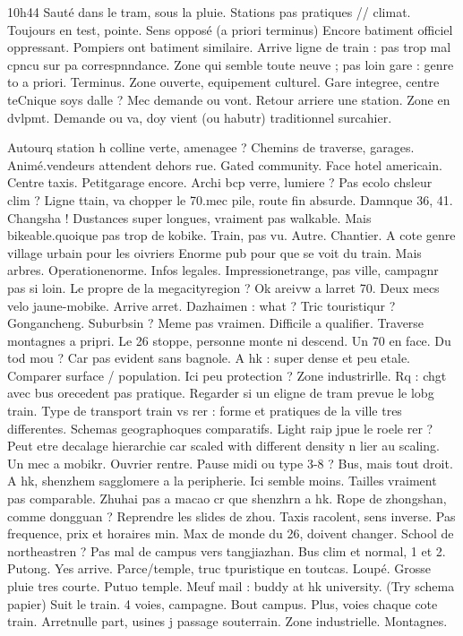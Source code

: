 10h44
Sauté dans le tram, sous la pluie.
Stations pas pratiques // climat.
Toujours en test, pointe.
Sens opposé (a priori terminus)
Encore batiment officiel oppressant. Pompiers ont batiment similaire.
Arrive ligne de train : pas trop mal cpncu sur pa correspnndance. Zone qui semble toute neuve ; pas loin gare : genre to a priori. Terminus. Zone ouverte, equipement culturel. Gare integree, centre teCnique soys dalle ? Mec demande ou vont. Retour arriere une station.
Zone en dvlpmt. Demande ou va, doy vient (ou habutr) traditionnel surcahier.

Autourq station h colline verte, amenagee ?
Chemins de traverse, garages. Animé.vendeurs attendent dehors rue.
Gated community. Face hotel americain.
Centre taxis. Petitgarage encore. Archi bcp verre, lumiere ? Pas ecolo chsleur clim ?
Ligne ttain, va chopper le 70.mec pile, route fin absurde.
Damnque 36, 41. Changsha !
Dustances super longues, vraiment pas walkable. Mais bikeable.quoique pas trop de kobike. Train, pas vu. Autre.
Chantier. A cote genre village urbain pour les oivriers
Enorme pub pour que se voit du train. Mais arbres.
Operationenorme. Infos legales.
Impressionetrange, pas ville, campagnr pas si loin. Le propre de la megacityregion ?
Ok areivw a larret 70.
Deux mecs velo jaune-mobike.
Arrive arret. Dazhaimen : what ? Tric touristiqur ?
Gongancheng.
Suburbsin ? Meme pas vraimen. Difficile a qualifier.
Traverse montagnes a pripri. Le 26 stoppe, personne monte ni descend. Un 70 en face.
Du tod mou ? Car pas evident sans bagnole. A hk : super dense et peu etale. Comparer surface / population. Ici peu protection ?
Zone industrirlle. Rq : chgt avec bus orecedent pas pratique. Regarder si un eligne de tram prevue le lobg train. Type de transport train vs rer : forme et pratiques de la ville tres differentes. Schemas geographoques comparatifs. Light raip jpue le roele rer ? Peut etre decalage hierarchie car scaled with different density n lier au scaling.
Un mec a mobikr. Ouvrier rentre. Pause midi ou type 3-8 ? Bus, mais tout droit.
A hk, shenzhem sagglomere a la peripherie. Ici semble moins. Tailles vraiment pas comparable. Zhuhai pas a macao cr que shenzhrn a hk. Rope de zhongshan, comme dongguan ? Reprendre les slides de zhou.
Taxis racolent, sens inverse.
Pas frequence, prix et horaires min. Max de monde du 26, doivent changer. School de northeastren ? Pas mal de campus vers tangjiazhan. Bus clim et normal, 1 et 2.
Putong. Yes arrive.
Parce/temple, truc tpuristique en toutcas. Loupé.
Grosse pluie tres courte.
Putuo temple.
Meuf mail : buddy at hk university.
(Try schema papier)
Suit le train. 4 voies, campagne. Bout campus. Plus, voies chaque cote train.
Arretnulle part, usines j passage souterrain. Zone industrielle. Montagnes.

